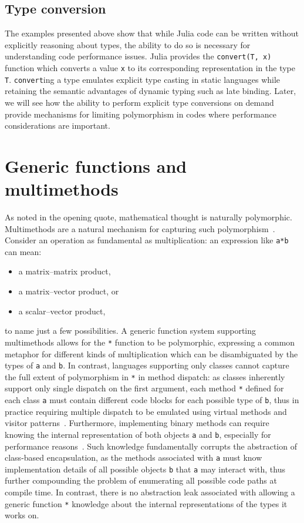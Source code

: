 \documentclass[pldi]{sigplanconf-pldi15}
\begin{document}
\subsection{Type conversion}

The examples presented above show that while Julia code can be written without
explicitly reasoning about types, the ability to do so is necessary for
understanding code performance issues. Julia provides the \verb|convert(T, x)|
function which converts a value \verb|x| to its corresponding representation in
the type \verb|T|. \verb|convert|ing a type emulates explicit type casting in
static languages while retaining the semantic advantages of dynamic typing such
as late binding. Later, we will see how the ability to perform explicit type
conversions on demand provide mechanisms for limiting polymorphism in codes
where performance considerations are important.


\section{Generic functions and multimethods}

As \cite{Poincare1908} noted in the opening quote, mathematical thought is
naturally polymorphic. Multimethods are a natural mechanism for capturing such
polymorphism~\cite{Bezanson2014b,Chen2014}. Consider an operation as
fundamental as multiplication: an expression like \verb|a*b| can mean:

\begin{itemize}
	\item a matrix--matrix product,
	\item a matrix--vector product, or
	\item a scalar--vector product,
\end{itemize}
%
to name just a few possibilities. A generic function system supporting
multimethods allows for the \verb|*| function to be polymorphic, expressing a
common metaphor for different kinds of multiplication which can be
disambiguated by the types of \verb|a| and \verb|b|. In contrast, languages
supporting only classes cannot capture the full extent of polymorphism in
\verb|*| in method dispatch: as classes inherently support only single dispatch
on the first argument, each method \verb|*| defined for each class \verb|a|
must contain different code blocks for each possible type of \verb|b|, thus in
practice requiring multiple dispatch to be emulated using virtual methods and
visitor patterns~\cite{designpatterns}. Furthermore, implementing binary methods can
require knowing the internal representation of both objects \verb|a| and
\verb|b|, especially for performance reasons~\cite{Bruce1995}. Such knowledge
fundamentally corrupts the abstraction of class-based encapsulation, as the
methods associated with \verb|a| must know implementation details of all
possible objects \verb|b| that \verb|a| may interact with, thus further
compounding the problem of enumerating all possible code paths at compile time.
In contrast, there is no abstraction leak associated with allowing a generic
function \verb|*| knowledge about the internal representations of the types it
works on.
\end{document}
